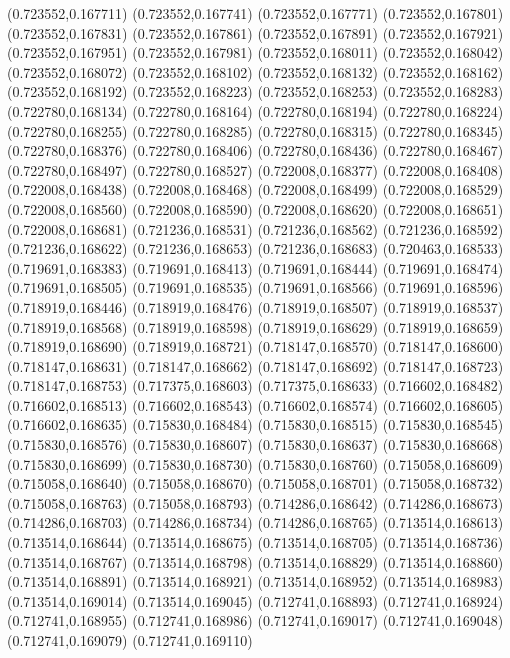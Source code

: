 (0.723552,0.167711)
(0.723552,0.167741)
(0.723552,0.167771)
(0.723552,0.167801)
(0.723552,0.167831)
(0.723552,0.167861)
(0.723552,0.167891)
(0.723552,0.167921)
(0.723552,0.167951)
(0.723552,0.167981)
(0.723552,0.168011)
(0.723552,0.168042)
(0.723552,0.168072)
(0.723552,0.168102)
(0.723552,0.168132)
(0.723552,0.168162)
(0.723552,0.168192)
(0.723552,0.168223)
(0.723552,0.168253)
(0.723552,0.168283)
(0.722780,0.168134)
(0.722780,0.168164)
(0.722780,0.168194)
(0.722780,0.168224)
(0.722780,0.168255)
(0.722780,0.168285)
(0.722780,0.168315)
(0.722780,0.168345)
(0.722780,0.168376)
(0.722780,0.168406)
(0.722780,0.168436)
(0.722780,0.168467)
(0.722780,0.168497)
(0.722780,0.168527)
(0.722008,0.168377)
(0.722008,0.168408)
(0.722008,0.168438)
(0.722008,0.168468)
(0.722008,0.168499)
(0.722008,0.168529)
(0.722008,0.168560)
(0.722008,0.168590)
(0.722008,0.168620)
(0.722008,0.168651)
(0.722008,0.168681)
(0.721236,0.168531)
(0.721236,0.168562)
(0.721236,0.168592)
(0.721236,0.168622)
(0.721236,0.168653)
(0.721236,0.168683)
(0.720463,0.168533)
(0.719691,0.168383)
(0.719691,0.168413)
(0.719691,0.168444)
(0.719691,0.168474)
(0.719691,0.168505)
(0.719691,0.168535)
(0.719691,0.168566)
(0.719691,0.168596)
(0.718919,0.168446)
(0.718919,0.168476)
(0.718919,0.168507)
(0.718919,0.168537)
(0.718919,0.168568)
(0.718919,0.168598)
(0.718919,0.168629)
(0.718919,0.168659)
(0.718919,0.168690)
(0.718919,0.168721)
(0.718147,0.168570)
(0.718147,0.168600)
(0.718147,0.168631)
(0.718147,0.168662)
(0.718147,0.168692)
(0.718147,0.168723)
(0.718147,0.168753)
(0.717375,0.168603)
(0.717375,0.168633)
(0.716602,0.168482)
(0.716602,0.168513)
(0.716602,0.168543)
(0.716602,0.168574)
(0.716602,0.168605)
(0.716602,0.168635)
(0.715830,0.168484)
(0.715830,0.168515)
(0.715830,0.168545)
(0.715830,0.168576)
(0.715830,0.168607)
(0.715830,0.168637)
(0.715830,0.168668)
(0.715830,0.168699)
(0.715830,0.168730)
(0.715830,0.168760)
(0.715058,0.168609)
(0.715058,0.168640)
(0.715058,0.168670)
(0.715058,0.168701)
(0.715058,0.168732)
(0.715058,0.168763)
(0.715058,0.168793)
(0.714286,0.168642)
(0.714286,0.168673)
(0.714286,0.168703)
(0.714286,0.168734)
(0.714286,0.168765)
(0.713514,0.168613)
(0.713514,0.168644)
(0.713514,0.168675)
(0.713514,0.168705)
(0.713514,0.168736)
(0.713514,0.168767)
(0.713514,0.168798)
(0.713514,0.168829)
(0.713514,0.168860)
(0.713514,0.168891)
(0.713514,0.168921)
(0.713514,0.168952)
(0.713514,0.168983)
(0.713514,0.169014)
(0.713514,0.169045)
(0.712741,0.168893)
(0.712741,0.168924)
(0.712741,0.168955)
(0.712741,0.168986)
(0.712741,0.169017)
(0.712741,0.169048)
(0.712741,0.169079)
(0.712741,0.169110)

